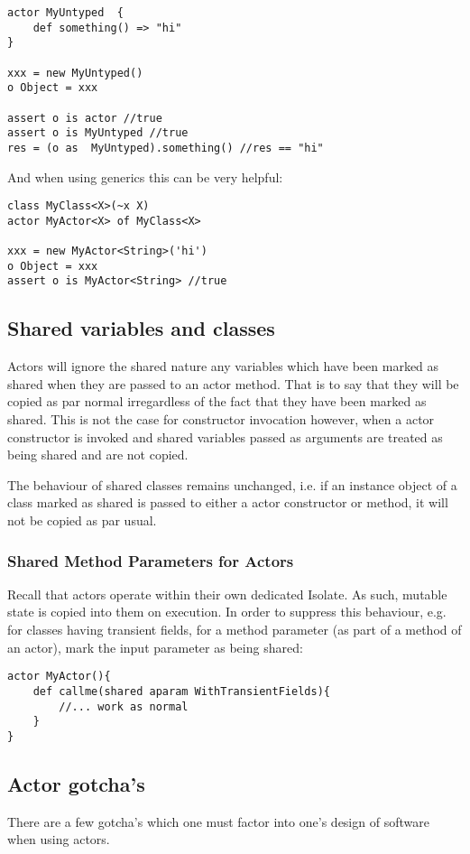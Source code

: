 \documentclass[conc-doc]{subfiles}
\begin{document}
\begin{lstlisting}
actor MyUntyped  {
	def something() => "hi"
}

xxx = new MyUntyped()
o Object = xxx

assert o is actor //true
assert o is MyUntyped //true
res = (o as  MyUntyped).something() //res == "hi"
\end{lstlisting}

And when using generics this can be very helpful:

\begin{lstlisting}
class MyClass<X>(~x X)
actor MyActor<X> of MyClass<X>

xxx = new MyActor<String>('hi')
o Object = xxx
assert o is MyActor<String> //true
\end{lstlisting}


\subsection{Shared variables and classes}
Actors will ignore the shared nature any variables which have been marked as shared when they are passed to an actor method. That is to say that they will be copied as par normal irregardless of the fact that they have been marked as shared. This is not the case for constructor invocation however, when a actor constructor is invoked and shared variables passed as arguments are treated as being shared and are not copied.

The behaviour of shared classes remains unchanged, i.e. if an instance object of a class marked as shared is passed to either a actor constructor or method, it will not be copied as par usual.

\subsubsection{Shared Method Parameters for Actors}
Recall that actors operate within their own dedicated Isolate. As such, mutable state is copied into them on execution. In order to suppress this behaviour, e.g. for classes having transient fields, for a method parameter (as part of a method of an actor), mark the input parameter as being shared:

\begin{lstlisting}
actor MyActor(){
	def callme(shared aparam WithTransientFields){
		//... work as normal
	}
}
\end{lstlisting}

\subsection{Actor gotcha's}
There are a few gotcha's which one must factor into one's design of software when using actors. 
\end{document}

